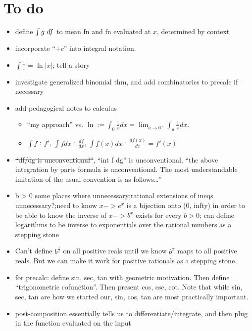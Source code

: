 \documentclass{article}
\begin{document}
\maketitle

\section*{To do}

\begin{itemize}
    \item define $\int g \text{ } df$ to mean fn and fn evaluated at $x$, determined by context

    \item incorporate ``$+ c$'' into integral notation.

    \item $\int \frac{1}{x} = \ln|x|$; tell a story
    
    \item investigate generalized binomial thm, and add combinatorics to precalc if necessary
    \item add pedagogical notes to calculus
    \begin{itemize}
        \item ``my approach'' vs. $\ln := \int_0 \frac{1}{x} dx = \lim_{a \rightarrow 0^+} \int_a \frac{1}{x} dx$.
        \item $\int f$ : $f'$, $\int f dx$ : $\frac{df}{dx}$, $\int f(x) dx$ : $\frac{df(x)}{dx} = f'(x)$
    \end{itemize}
    \item \sout{“df/dg is unconventional”}, “int f dg” is unconventional, “the above integration by parts formula is unconventional. The most understandable imitation of the usual convention is as follows…”
    \item b > 0 some places where unnecessary;rational extensions of ineqs unnecessary?;need to know $x -> e^x$ is a bijection onto (0, infty) in order to be able to know the inverse of $x -> b^x$ exists for every $b > 0$; can define logarithms to be inverse to exponentials over the rational numbers as a stepping stone 
    \item Can't define $b^{\frac{1}{x}}$ on all positive reals until we know $b^x$ maps to all positive reals. But we can make it work for positive rationals as a stepping stone.
    \item for precalc: define sin, sec, tan with geometric motivation. Then define ``trigonometric cofunction''. Then present cos, csc, cot. Note that while sin, sec, tan are how we started our, sin, cos, tan are most practically important. 
    \item post-composition essentially tells us to differentiate/integrate, and then plug in the function evaluated on the input 
\end{itemize}
\end{document}
